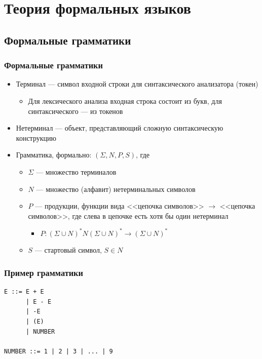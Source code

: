 \documentclass[xetex,mathserif,serif]{beamer}
\begin{document}
	\section{Теория формальных языков}

	\subsection{Формальные грамматики}

	\begin{frame}
		\frametitle{Формальные грамматики}
		\begin{itemize}
			\item Терминал --- символ входной строки для синтаксического анализатора (токен)
			\begin{itemize}
				\item Для лексического анализа входная строка состоит из букв, для синтаксического --- из токенов
			\end{itemize}
			\item Нетерминал --- объект, представляющий сложную синтаксическую конструкцию
			\item Грамматика, формально: $(\Sigma, N, P, S)$, где
			\begin{itemize}
				\item $\Sigma$ --- множество терминалов
				\item $N$ --- множество (алфавит) нетерминальных символов
				\item $P$ --- продукции, функции вида <<цепочка символов>> $\rightarrow$ <<цепочка символов>>, где слева в цепочке есть хотя бы один нетерминал
				\begin{itemize}
					\item $P: (\Sigma \cup N)^* N (\Sigma \cup N)^* \rightarrow (\Sigma \cup N)^*$
				\end{itemize}
				\item $S$ --- стартовый символ, $S \in N$
			\end{itemize}
		\end{itemize}
	\end{frame}

	\begin{frame}[fragile]
		\frametitle{Пример грамматики}
		\begin{verbatim}
E ::= E + E
      | E - E
      | -E
      | (E)
      | NUMBER

NUMBER ::= 1 | 2 | 3 | ... | 9
		\end{verbatim}
	\end{frame}
\end{document}
